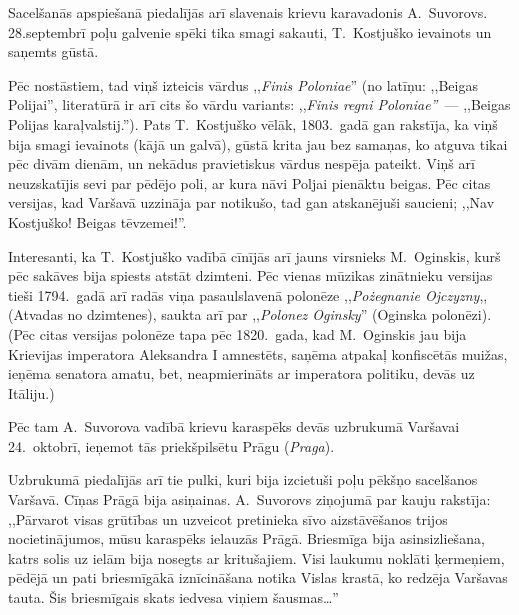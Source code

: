 \documentclass[twoside,a5paper,12pt,fleqn,openany]{extbook}
\newcommand{\pltxti}[1]{\textit{\textpolish{#1}}}
\newcommand{\latxti}[1]{\textit{\textlatin{#1}}}
\begin{document}
Sacelšanās apspiešanā piedalījās arī slavenais krievu karavadonis A.~Suvorovs. 28.septembrī poļu galvenie spēki tika smagi sakauti, T.~Kostjuško ievainots un saņemts gūstā.

Pēc nostāstiem, tad viņš izteicis vārdus ,,\latxti{Finis Poloniae}'' (no latīņu: ,,Beigas Polijai'', literatūrā ir arī cits šo vārdu variants: ,,\latxti{Finis regni Poloniae''}~--- ,,Beigas Polijas karaļvalstij.''). Pats T.~Kostjuško vēlāk, 1803.~gadā gan rakstīja, ka viņš bija smagi ievainots (kājā un galvā), gūstā krita jau bez samaņas, ko atguva tikai pēc divām dienām, un nekādus pravietiskus vārdus nespēja pateikt. Viņš arī neuzskatījis sevi par pēdējo poli, ar kura nāvi Poljai pienāktu beigas. Pēc citas versijas, kad Varšavā uzzināja par notikušo, tad gan atskanējuši saucieni; ,,Nav Kostjuško! Beigas tēvzemei!''.

Interesanti, ka T.~Kostjuško vadībā cīnījās arī jauns virsnieks M.~Oginskis, kurš pēc sakāves bija spiests atstāt dzimteni. Pēc vienas mūzikas zinātnieku versijas tieši 1794.~gadā arī radās viņa pasaulslavenā polonēze ,,\pltxti{Pożegnanie Ojczyzny},, (Atvadas no dzimtenes), saukta arī par ,,\pltxti{Polonez Oginsky}'' (Oginska polonēzi). (Pēc citas versijas polonēze tapa pēc 1820.~gada, kad M.~Oginskis jau bija Krievijas imperatora Aleksandra I amnestēts, saņēma atpakaļ konfiscētās muižas, ieņēma senatora amatu, bet, neapmierināts ar imperatora politiku, devās uz Itāliju.)

Pēc tam A.~Suvorova vadībā krievu karaspēks devās uzbrukumā Varšavai 24.~oktobrī, ieņemot tās priekšpilsētu Prāgu (\pltxti{Praga}).

Uzbrukumā piedalījās arī tie pulki, kuri bija izcietuši poļu pēkšņo sacelšanos Varšavā. Cīņas Prāgā bija asiņainas. A.~Suvorovs ziņojumā par kauju rakstīja: ,,Pārvarot visas grūtības un uzveicot pretinieka sīvo aizstāvēšanos trijos nocietinājumos, mūsu karaspēks ielauzās Prāgā. Briesmīga bija asinsizliešana, katrs solis uz ielām bija nosegts ar kritušajiem. Visi laukumu noklāti ķermeņiem, pēdējā un pati briesmīgākā iznīcināšana notika Vislas krastā, ko redzēja Varšavas tauta. Šis briesmīgais skats iedvesa viņiem šausmas…''
\end{document}
